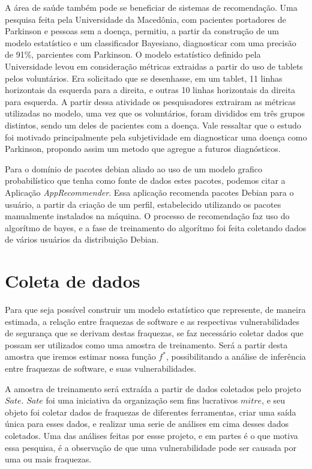 A área de saúde também pode se beneficiar de sistemas de recomendação. Uma pesquisa feita pela Universidade da Macedônia,  com pacientes portadores de Parkinson e pessoas sem a doença, permitiu, a partir da construção de um modelo estatístico e um classificador Bayesiano, diagnosticar com uma precisão de 91\%, parcientes com Parkinson\cite{Kotsavasiloglou}. O modelo estatístico definido pela Universidade levou em consideração métricas extraidas a partir do uso de tablets pelos voluntários. Era solicitado que se desenhasse, em um tablet, 11 linhas horizontais da esquerda para a direita, e outras 10 linhas horizontais da direita para esquerda. A partir dessa atividade os pesquisadores extrairam as métricas utilizadas no modelo, uma vez que os voluntários, foram divididos em três grupos distintos, sendo um deles de pacientes com a doença. Vale ressaltar que o estudo foi motivado principalmente pela subjetividade em diagnosticar uma doença como Parkinson, propondo assim um metodo que agregue a futuros diagnósticos.

Para o domínio de pacotes debian aliado ao uso de um modelo grafico probabilístico que tenha como fonte de dados estes pacotes, podemos citar a Aplicação \textit{AppRecommender}. Essa aplicação recomenda pacotes Debian para o usuário,
a partir da criação de um perfil, estabelecido utilizando os pacotes manualmente instalados na máquina.
O processo de recomendação faz uso do algorítmo de bayes, e a fase de treinamento do algorítmo foi feita coletando dados de vários usuários da distribuição Debian.

\section{Coleta de dados}
Para que seja possível construir um modelo estatístico que represente, de maneira estimada, a relação entre fraquezas de software
e as respectivas vulnerabilidades de segurança que se derivam destas fraquezas, se faz necessário coletar dados que possam ser utilizados como uma amostra de treinamento. Será a partir desta amostra que iremos estimar nossa função $f^*$, possibilitando a análise de inferência entre fraquezas de software, e suas vulnerabilidades.

A amostra de treinamento será extraída a partir de dados coletados pelo projeto $Sate$. $Sate$ foi uma iniciativa da organização sem fins lucrativos $mitre$, e seu objeto foi coletar dados de fraquezas de diferentes ferramentas, criar uma saída única para esses dados, e realizar uma serie de análises em cima desses dados coletados. Uma das análises feitas por essse projeto, e em partes é o que motiva essa pesquisa, é a observação de que uma vulnerabilidade pode ser causada por uma ou mais fraquezas.

